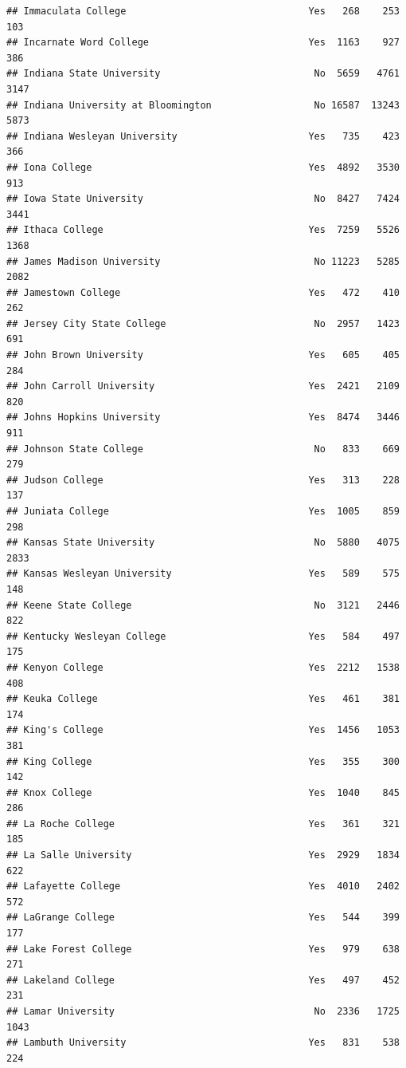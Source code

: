 \documentclass[
]{article}
\begin{document}
\begin{verbatim}
## Immaculata College                                Yes   268    253    103
## Incarnate Word College                            Yes  1163    927    386
## Indiana State University                           No  5659   4761   3147
## Indiana University at Bloomington                  No 16587  13243   5873
## Indiana Wesleyan University                       Yes   735    423    366
## Iona College                                      Yes  4892   3530    913
## Iowa State University                              No  8427   7424   3441
## Ithaca College                                    Yes  7259   5526   1368
## James Madison University                           No 11223   5285   2082
## Jamestown College                                 Yes   472    410    262
## Jersey City State College                          No  2957   1423    691
## John Brown University                             Yes   605    405    284
## John Carroll University                           Yes  2421   2109    820
## Johns Hopkins University                          Yes  8474   3446    911
## Johnson State College                              No   833    669    279
## Judson College                                    Yes   313    228    137
## Juniata College                                   Yes  1005    859    298
## Kansas State University                            No  5880   4075   2833
## Kansas Wesleyan University                        Yes   589    575    148
## Keene State College                                No  3121   2446    822
## Kentucky Wesleyan College                         Yes   584    497    175
## Kenyon College                                    Yes  2212   1538    408
## Keuka College                                     Yes   461    381    174
## King's College                                    Yes  1456   1053    381
## King College                                      Yes   355    300    142
## Knox College                                      Yes  1040    845    286
## La Roche College                                  Yes   361    321    185
## La Salle University                               Yes  2929   1834    622
## Lafayette College                                 Yes  4010   2402    572
## LaGrange College                                  Yes   544    399    177
## Lake Forest College                               Yes   979    638    271
## Lakeland College                                  Yes   497    452    231
## Lamar University                                   No  2336   1725   1043
## Lambuth University                                Yes   831    538    224

\end{verbatim}
\end{document}
